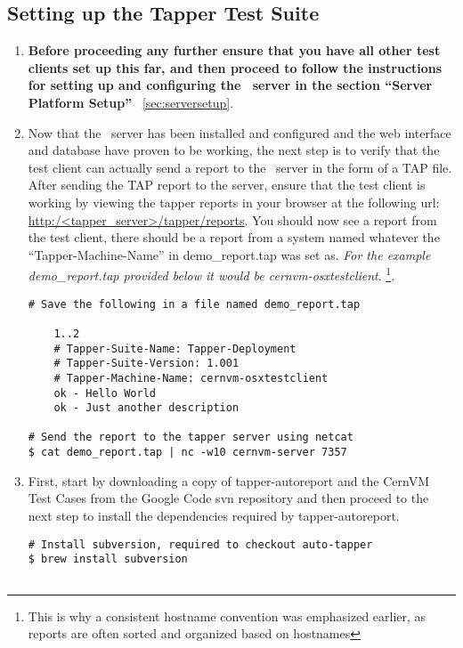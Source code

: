 \subsection{Setting up the Tapper Test Suite}
\label{sec:osxtestsuite}
\begin{enumerate}
\item 	{\bf Before proceeding any further ensure that you have all other test clients set up this far, and then proceed
		to follow the instructions for setting up and configuring the \tapper~server in the section ``Server Platform Setup''}		
		~\ref{sec:serversetup}.
		
\item 	Now that the \tapper~server has been installed and configured and the \tapper web interface and database have proven
		to be working, the next step is to verify that the test client can actually send a report to the \tapper~server in
		the form of a TAP file. After sending the TAP report to the server, ensure that the test client is working by viewing 
		the tapper reports in your browser at the following url: \url{http:/<tapper\_server>/tapper/reports}. You should now see a 
		report from the test client, there should be a report from a system named whatever the ``Tapper-Machine-Name'' in 
		demo\_report.tap was set as. \emph{For the example demo\_report.tap provided below it would be cernvm-osxtestclient}.
		\footnote{This is why a consistent hostname convention was emphasized earlier, as reports are often sorted and organized 
		based on hostnames}.
		
\lstset{language=bash,caption=Send a Basic Report to the \tapper~Server}
\begin{lstlisting}
# Save the following in a file named demo_report.tap

	1..2
	# Tapper-Suite-Name: Tapper-Deployment
	# Tapper-Suite-Version: 1.001
	# Tapper-Machine-Name: cernvm-osxtestclient
	ok - Hello World
	ok - Just another description

# Send the report to the tapper server using netcat
$ cat demo_report.tap | nc -w10 cernvm-server 7357
\end{lstlisting}

\item 	First, start by downloading a copy of tapper-autoreport and the CernVM Test Cases from the Google Code svn repository
		\cite{GCreleasetesting} and then proceed to the next step to install the dependencies required by tapper-autoreport.
		
\lstset{language=bash,caption=Install \tapper~AutoReport}
\begin{lstlisting}
# Install subversion, required to checkout auto-tapper
$ brew install subversion


\end{lstlisting}
\end{enumerate}
